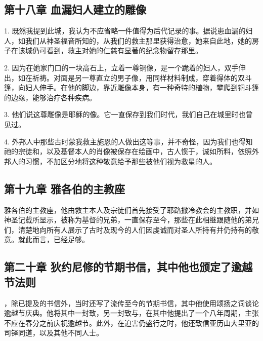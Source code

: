 
\subsection{第十八章 血漏妇人建立的雕像}

1. 既然我提到此城，我认为不应省略一件值得为后代记录的事。据说患血漏的妇人，如我们从神圣福音所知的，从我们的救主那里获得治愈，她来自此地，她的房子在该城仍可看到，救主对她的仁慈有显著的纪念物留存那里。\par

2. 因为在她家门口的一块高石上，立着一尊铜像，是一个跪着的妇人，双手伸出，如在祈祷。对面是另一尊直立的男子像，用同样材料制成，穿着得体的双斗篷，向妇人伸手。在他的脚边，靠近雕像本身，有一种奇特的植物，攀爬到铜斗篷的边缘，能够治疗各种疾病。\par

3. 他们说这尊雕像是耶稣的像。它一直保存到我们时代，我们自己在城里时也曾见过。\par

4. 外邦人中那些古时蒙我救主施恩的人做出这等事，并不奇怪，因为我们也得知祂的宗徒和，以及基督本人的肖像被保存在绘画中，古人惯于，诚如所料，依照外邦人的习惯，不加区分地将这种敬意给予那些被他们视为救星的人。\par


\subsection{第十九章 雅各伯的主教座}

雅各伯的主教座，他由救主本人及宗徒们首先接受了耶路撒冷教会的主教职，并如神圣记载所显示，被称为基督的兄弟，一直保存至今，那些在此相继跟随他的弟兄们，清楚地向所有人展示了古时及现今的人们因虔诚而对圣人所持有并仍持有的敬意。就此而言，已经足够。\par


\subsection{第二十章 狄约尼修的节期书信，其中他也颁定了逾越节法则}

，除已提及的书信外，当时还写了流传至今的节期书信，其中他使用颂扬之词谈论逾越节庆典。他将其中一封致，另一封致与，在其中他提出了一个八年周期，主张不应在春分之前庆祝逾越节。此外，在迫害仍盛行之时，他还致信亚历山大里亚的司铎同道，以及其他不同人士。\par

